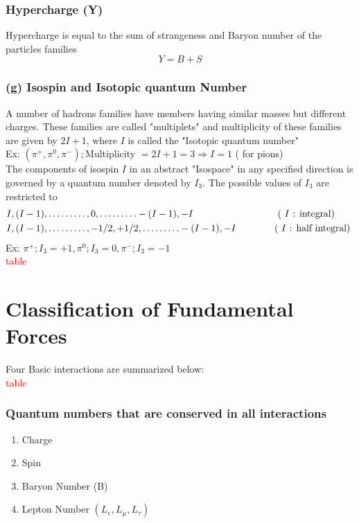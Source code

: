 \subsubsection{Hypercharge (Y)}
Hypercharge is equal to the sum of strangeness and Baryon number of the particles families
$$
Y=B+S
$$
\subsubsection{(g) Isospin and Isotopic quantum Number}
A number of hadrons families have members having similar masses but different charges. These families are called "multiplets" and multiplicity of these families are given by $2 I+1$, where $I$ is called the "Isotopic quantum number"\\
Ex: $\left(\pi^{+}, \pi^0, \pi^{-}\right) ;$Multiplicity $=2 I+1=3 \Rightarrow I=1$ ( for pions)\\
The components of isospin $I$ in an abstract "Isospace" in any specified direction is governed by a quantum number denoted by $I_3$. The possible values of $I_3$ are restricted to
\begin{align*}
&I,(I-1), \ldots \ldots \ldots, 0, \ldots \ldots \ldots-(I-1),-I\hspace{3cm}\text { ( } I \text { : integral) } \\
&I,(I-1), \ldots \ldots \ldots,-1 / 2,+1 / 2, \ldots \ldots \ldots-(I-1),-I\hspace{1.3cm}\text { ( } I \text { : half integral) }
\end{align*}
Ex: $\pi^{+} ; I_3=+1, \pi^0 ; I_3=0, \pi^{-} ; I_3=-1$\\
\textcolor{red}{table}
\section{Classification of Fundamental Forces}
Four Basic interactions are summarized below:\\
\textcolor{red}{table}\\
\subsubsection{Quantum numbers that are conserved in all interactions}
\begin{enumerate}[label=\alph*)]
	\item  Charge
	\item  Spin
	\item  Baryon Number (B)
	\item  Lepton Number $\left(L_e, L_\mu, L_\tau\right)$
\end{enumerate}

